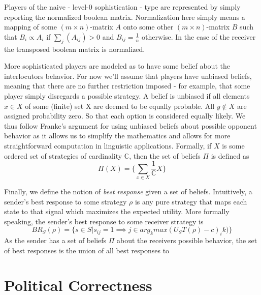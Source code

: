 \documentclass{article}
\begin{document}
Players of the naive - level-0 sophistication - type are represented by simply reporting the normalized boolean matrix. Normalization here simply means a mapping of some $(m\times n)$-matrix $A$ onto some other $(m\times n)$-matrix $B$ such that $B_i\propto A_i$ if $\sum_j (A_{ij})>0$ and $B_{ij}=\tfrac{1}{n}$ otherwise. In the case of the receiver the transposed boolean matrix is normalized.

More sophisticated players are modeled as to have some belief about the interlocutors behavior. For now we'll assume that players have unbiased beliefs, meaning that there are no further restriction imposed - for example, that some player simply disregards a possible strategy. A belief is unbiased if all elements $x\in X$ of some (finite) set X are deemed to be equally probable. All $y\not\in X$ are assigned probability zero. So that each option is considered equally likely. We thus follow Franke's argument for %
 using unbiased beliefs about possible opponent behavior as it allows us to simplify the mathematics and allows for more straightforward computation in linguistic applications. Formally, if $X$ is some ordered set of strategies of cardinality $\mathbb{C}$, then the set of beliefs $\Pi$ is defined as\\
\begin{equation*}
\Pi(X)=\{\sum_{x\in X} \dfrac{1}{\mathbb{C}}X\}
\end{equation*} %

Finally, we define the notion of \textit{best response} given a set of beliefs. Intuitively, a sender's best response to some strategy $\rho$ is any pure strategy that maps each state to that signal which maximizes the expected utility. More formally speaking, the sender's best response to some receiver strategy is\\
\begin{equation*}
BR_S(\rho)=\{s\in S | s_{ij}=1\implies j \in arg_kmax(U_S T(\rho)-c)_ik)\}
\end{equation*}
As the sender has a set of beliefs $\Pi$ about the receivers possible behavior, the set of best responses is the union of all best responses to


\section{Political Correctness}
\end{document}
